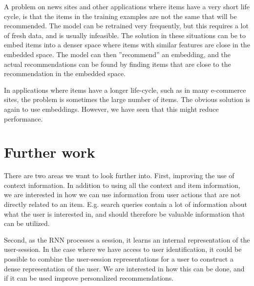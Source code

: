 A problem on news sites and other applications where items have a very short life cycle, is that the items in the training examples are not the same that will be recommended. The model can be retrained very frequently, but this requires a lot of fresh data, and is usually infeasible. The solution in these situations can be to embed items into a denser space where items with similar features are close in the embedded space. The model can then ''recommend'' an embedding, and the actual recommendations can be found by finding items that are close to the recommendation in the embedded space.

In applications where items have a longer life-cycle, such as in many e-commerce sites, the problem is sometimes the large number of items. The obvious solution is again to use embeddings. However, we have seen that this might reduce performance. 
 

\section{Further work}
There are two areas we want to look further into. First, improving the use of context information. In addition to using all the context and item information, we are interested in how we can use information from user actions that are not directly related to an item. E.g. search queries contain a lot of information about what the user is interested in, and should therefore be valuable information that can be utilized. 

Second, as the RNN processes a session, it learns an internal representation of the user-session. In the case where we have access to user identification, it could be possible to combine the user-session representations for a user to construct a dense representation of the user. We are interested in how this can be done, and if it can be used improve personalized recommendations.



